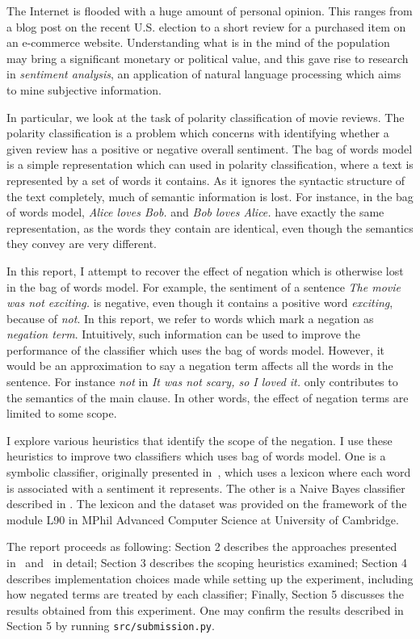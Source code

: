 The Internet is flooded with a huge amount of personal opinion. This ranges from a blog post on the recent U.S. election to a short review for a purchased item on an e-commerce website. Understanding what is in the mind of the population may bring a significant monetary or political value, and this gave rise to research in {\em sentiment analysis}, an application of natural language processing which aims to mine subjective information.

In particular, we look at the task of polarity classification of movie reviews. The polarity classification is a problem which concerns with identifying whether a given review has a positive or negative overall sentiment. The bag of words model is a simple representation which can used in polarity classification, where a text is represented by a set of words it contains. As it ignores the syntactic structure of the text completely, much of semantic information is lost. For instance, in the bag of words model, \textit{Alice loves Bob.} and \textit{Bob loves Alice.} have exactly the same representation, as the words they contain are identical, even though the semantics they convey are very different.

In this report, I attempt to recover the effect of negation which is otherwise lost in the bag of words model. For example, the sentiment of a sentence \textit{The movie was not exciting.} is negative, even though it contains a positive word \textit{exciting}, because of  \textit{not}. In this report, we refer to words which mark a negation as \emph{negation term}. Intuitively, such information can be used to improve the performance of the classifier which uses the bag of words model. However, it would be an approximation to say a negation term affects all the words in the sentence. For instance \textit{not} in \textit{It was not scary, so I loved it.} only contributes to the semantics of the main clause. In other words, the effect of negation terms are limited to some scope.

I explore various heuristics that identify the scope of the negation. I use these heuristics to improve two classifiers which uses bag of words model. One is a symbolic classifier, originally presented in~\citep{wilson2005recognizing}, which uses a lexicon where each word is associated with a sentiment it represents. The other is a Naive Bayes classifier described in \cite{pang2002thumbs}. The lexicon and the dataset was provided on the framework of the module L90 in MPhil Advanced Computer Science at University of Cambridge.

The report proceeds as following: Section 2 describes the approaches presented in~\citep{wilson2005recognizing} and~\citep{pang2002thumbs} in detail; Section 3 describes the scoping heuristics examined; Section 4 describes implementation choices made while setting up the experiment, including how negated terms are treated by each classifier; Finally, Section 5 discusses the results obtained from this experiment. One may confirm the results described in Section 5 by running \texttt{src/submission.py}.

